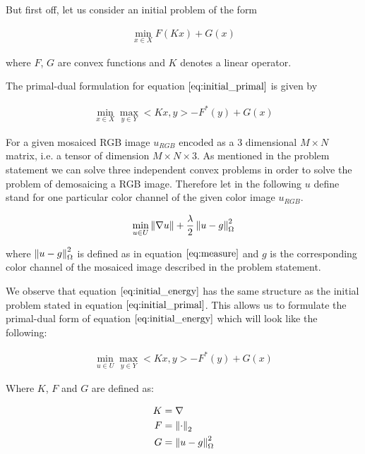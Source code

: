 But first off, let us consider an initial problem of the form 

\begin{align}
	\min_{x \in X} F(K x) + G(x)
\label{eq:initial_primal}	
\end{align}

where $F$, $G$ are convex functions and $K$ denotes a linear operator. 

The primal-dual formulation for equation $\ref{eq:initial_primal}$ is given by 

\begin{align}
	\min_{x \in X} \max_{y \in Y} < Kx, y > - F^*(y) + G(x)
\label{eq:initial_primal_dual}	
\end{align}


For a given mosaiced RGB image $u_{RGB}$ encoded as a 3 dimensional $M \times N$ matrix, i.e. a tensor of dimension $M \times N \times 3$. As mentioned in the problem statement we can solve three independent convex problems in order to solve the problem of demosaicing a RGB image. Therefore let in the following $u$ define stand for one particular color channel of the given color image $u_{RGB}$.

\begin{equation}
\min_{u \in U} \left\lVert\nabla u\right\rVert + \frac{\lambda}{2} \left\lVert u - g\right\rVert^2_{\Omega}
\label{eq:initial_energy}
\end{equation}

where $\left\lVert u - g\right\rVert^2_{\Omega}$ is defined as in equation $\ref{eq:measure}$ and $g$ is the corresponding color channel of the mosaiced image described in the problem statement.

We observe that equation $\ref{eq:initial_energy}$ has the same structure as the initial problem stated in equation $\ref{eq:initial_primal}$. This allows us to formulate the primal-dual form of equation $\ref{eq:initial_energy}$ which will look like the following:

\begin{align}
	\min_{u \in U} \max_{y \in Y} < Kx, y > - F^*(y) + G(x)
\label{eq:initial_primal_dual}	
\end{align}

Where $K$, $F$ and $G$ are defined as:

\begin{align}
	K &= \nabla \nonumber \\
	F &= \left\lVert\cdot\right\rVert_2 \nonumber \\
	G &= \left\lVert u - g\right\rVert^2_{\Omega}
\label{eq:def_kfg}	
\end{align}


